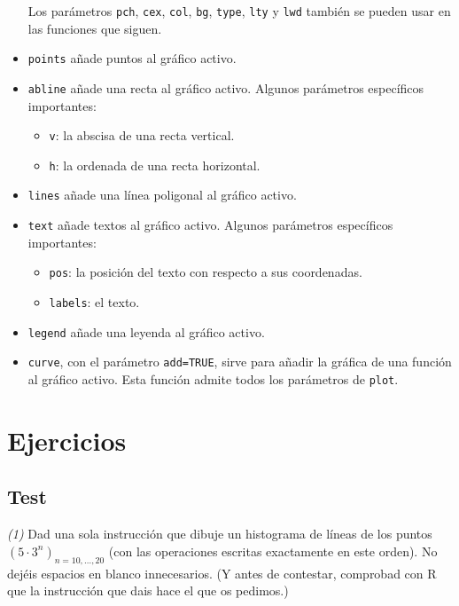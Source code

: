 \documentclass[
]{book}
\providecommand{\tightlist}{%
  \setlength{\itemsep}{0pt}\setlength{\parskip}{0pt}}
\theoremstyle{definition}
\theoremstyle{definition}
\theoremstyle{definition}
\theoremstyle{remark}
\begin{document}
\begin{itemize}
  Los parámetros \texttt{pch}, \texttt{cex}, \texttt{col}, \texttt{bg}, \texttt{type}, \texttt{lty} y \texttt{lwd} también se pueden usar en las funciones que siguen.
\item
  \texttt{points} añade puntos al gráfico activo.
\item
  \texttt{abline} añade una recta al gráfico activo. Algunos parámetros específicos importantes:

  \begin{itemize}
  \tightlist
  \item
    \texttt{v}: la abscisa de una recta vertical.
  \item
    \texttt{h}: la ordenada de una recta horizontal.
  \end{itemize}
\item
  \texttt{lines} añade una línea poligonal al gráfico activo.
\item
  \texttt{text} añade textos al gráfico activo. Algunos parámetros específicos importantes:

  \begin{itemize}
  \tightlist
  \item
    \texttt{pos}: la posición del texto con respecto a sus coordenadas.
  \item
    \texttt{labels}: el texto.
  \end{itemize}
\item
  \texttt{legend} añade una leyenda al gráfico activo.
\item
  \texttt{curve}, con el parámetro \texttt{add=TRUE}, sirve para añadir la gráfica de una función al gráfico activo. Esta función admite todos los parámetros de \texttt{plot}.
\end{itemize}

\hypertarget{ejercicios-5}{%
\section{Ejercicios}\label{ejercicios-5}}

\hypertarget{test-4}{%
\subsection*{Test}\label{test-4}}

\emph{(1)} Dad una sola instrucción que dibuje un histograma de líneas de los puntos \((5\cdot 3^n)_{n=10,\ldots,20}\) (con las operaciones escritas exactamente en este orden). No dejéis espacios en blanco innecesarios. (Y antes de contestar, comprobad con R que la instrucción que dais hace el que os pedimos.)
\end{document}
